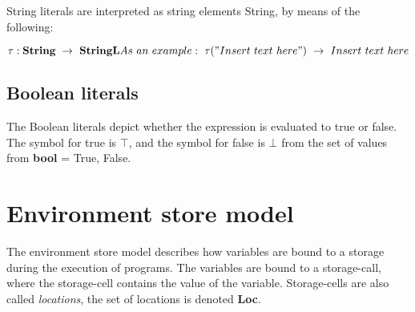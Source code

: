   
  String literals are interpreted as string elements String, by means of the following:
  
  \begin{math}
  	\tau : \textbf{String} \ \rightarrow \ \textbf{StringL} \newline
  	As \ an \ example: \ \tau("Insert \ text \ here") \ \rightarrow \ Insert \ text \ here
  \end{math}
  
  \subsection{Boolean literals}
  The Boolean literals depict whether the expression is evaluated to true or false. The symbol for true is \begin{math} \top \end{math}, and the symbol for false is \begin{math} \bot \end{math} from the set of values from \textbf{bool} = {True, False}.
  
  
  
  
  
  \section{Environment store model}
  The environment store model describes how variables are bound to a storage during the execution of programs. The variables are bound to a storage-call, where the storage-cell contains the value of the variable. Storage-cells are also called \textit{locations}, the set of locations is denoted \textbf{Loc}.
  
